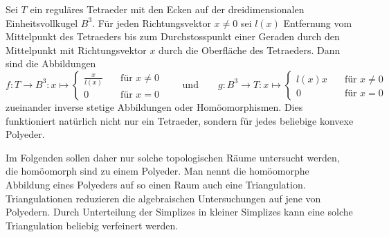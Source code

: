 \begin{beispiel}
\label{buch:homologie:projektion}
Sei $T$ ein reguläres Tetraeder mit den Ecken auf der dreidimensionalen
Einheitsvollkugel $B^3$.
Für jeden Richtungsvektor $x\ne 0$ sei $l(x)$ Entfernung vom Mittelpunkt des
Tetraeders bis zum Durchstosspunkt einer Geraden durch den Mittelpunkt
mit Richtungsvektor $x$ durch die Oberfläche des Tetraeders.
Dann sind die Abbildungen
\[
f\colon
T\to B^3
:
x \mapsto\begin{cases}
\displaystyle
\frac{x}{l(x)}&\quad\text{für $x\ne 0$}\\
0&\quad\text{für $x=0$}
\end{cases}
\qquad\text{und}\qquad
g\colon
B^3\to T
:
x \mapsto\begin{cases}
l(x) x&\quad\text{für $x\ne 0$}\\
0&\quad\text{für $x=0$}
\end{cases}
\]
zueinander inverse stetige Abbildungen oder Homöomorphismen.
Dies funktioniert natürlich nicht nur ein Tetraeder, sondern für jedes
beliebige konvexe Polyeder.
\end{beispiel}

Im Folgenden sollen daher nur solche topologischen Räume untersucht werden,
die homöomorph sind zu einem Polyeder.
Man nennt die homöomorphe Abbildung eines Polyeders auf so einen Raum
auch eine Triangulation.
Triangulationen reduzieren die algebraischen Untersuchungen auf jene
von Polyedern.
Durch Unterteilung der Simplizes in kleiner Simplizes kann eine solche
Triangulation beliebig verfeinert werden.






